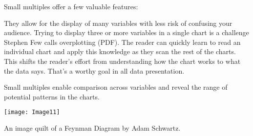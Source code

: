\documentclass{tufte-handout}
\begin{document}
Small multiples offer a few valuable features:

They allow for the display of many variables with less risk of confusing your audience. Trying to display three or more variables in a single chart is a challenge Stephen Few calls overplotting (PDF).
The reader can quickly learn to read an individual chart and apply this knowledge as they scan the rest of the charts. This shifts the reader's effort from understanding how the chart works to what the data says. That's a worthy goal in all data presentation.

Small multiples enable comparison across variables and reveal the range of potential patterns in the charts.



\begin{marginfigure}
\texttt{[image: Image11]}
\caption{An image quilt of a Feynman Diagram by Adam Schwartz.}
\end{marginfigure}





\vspace{1cm}



\vspace{1cm}
\end{document}
